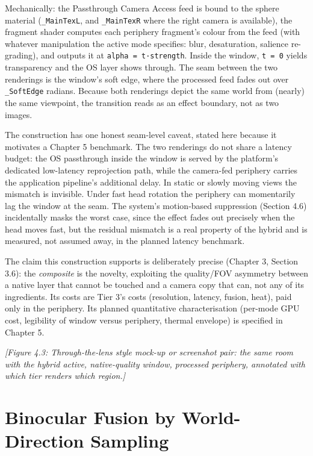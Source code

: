 Mechanically: the Passthrough Camera Access feed is bound to the sphere material (\verb|_MainTexL|, and
\verb|_MainTexR| where the right camera is available), the fragment shader computes each periphery
fragment's colour from the feed (with whatever manipulation the active mode specifies: blur,
desaturation, salience re-grading), and outputs it at \verb|alpha = t·strength|. Inside the window,
\verb|t = 0| yields transparency and the OS layer shows through. The seam between the two renderings is
the window's soft edge, where the processed feed fades out over \verb|_SoftEdge| radians. Because both
renderings depict the same world from (nearly) the same viewpoint, the transition reads as an effect
boundary, not as two images.

The construction has one honest seam-level caveat, stated here because it motivates a Chapter 5
benchmark. The two renderings do not share a latency budget: the OS passthrough inside the window is
served by the platform's dedicated low-latency reprojection path, while the camera-fed periphery
carries the application pipeline's additional delay. In static or slowly moving views the mismatch is
invisible. Under fast head rotation the periphery can momentarily lag the window at the seam. The
system's motion-based suppression (Section 4.6) incidentally masks the worst case, since the effect
fades out precisely when the head moves fast, but the residual mismatch is a real property of the
hybrid and is measured, not assumed away, in the planned latency benchmark.

The claim this construction supports is deliberately precise (Chapter 3, Section 3.6): the
\textit{composite} is the novelty, exploiting the quality/FOV asymmetry between a native layer that cannot
be touched and a camera copy that can, not any of its ingredients. Its costs are Tier 3's costs
(resolution, latency, fusion, heat), paid only in the periphery. Its planned quantitative
characterisation (per-mode GPU cost, legibility of window versus periphery, thermal envelope) is
specified in Chapter 5.

\textit{[Figure 4.3: Through-the-lens style mock-up or screenshot pair: the same room with the hybrid
active, native-quality window, processed periphery, annotated with which tier renders which
region.]}

\section{Binocular Fusion by World-Direction Sampling}

